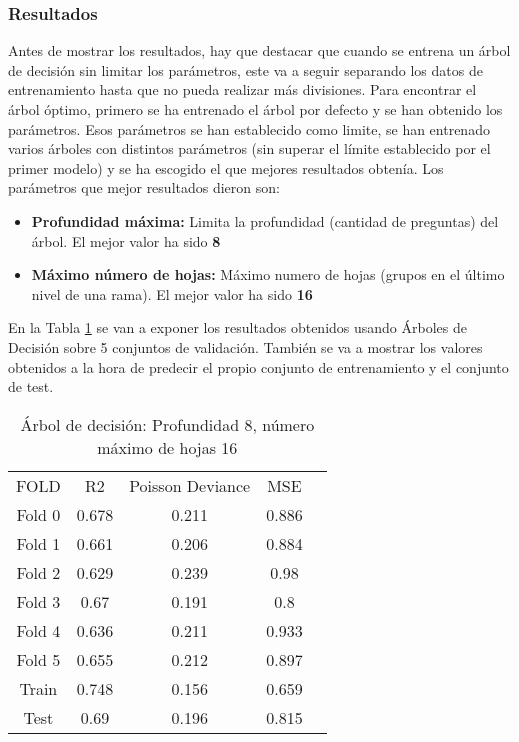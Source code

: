 \subsubsection*{Resultados}
\label{sec:res_tree}
Antes de mostrar los resultados, hay que destacar que cuando se entrena un árbol de decisión sin limitar los parámetros, este va a seguir separando los datos de entrenamiento hasta que no pueda realizar más divisiones. Para encontrar el árbol óptimo, primero se ha entrenado el árbol por defecto y se han obtenido los parámetros. Esos parámetros se han establecido como limite, se han entrenado varios árboles con distintos parámetros (sin superar el límite establecido por el primer modelo) y se ha escogido el que mejores resultados obtenía. Los parámetros que mejor resultados dieron son: \\
\begin{itemize}
	\item \textbf{Profundidad máxima:} Limita la profundidad (cantidad de preguntas) del árbol. El mejor valor ha sido \textbf{8}
	\item \textbf{Máximo número de hojas:} Máximo numero de hojas (grupos en el último nivel de una rama). El mejor valor ha sido \textbf{16}
\end{itemize}
En la Tabla \ref{tab:tree_res} se van a exponer los resultados obtenidos usando Árboles de Decisión sobre 5 conjuntos de validación. También se va a mostrar los valores obtenidos a la hora de predecir el propio conjunto de entrenamiento y el conjunto de test.
\begin{table}[H]
	\centering
	\begin{tabular}{|c|c|c|c|c}
		\cline{1-4}
		FOLD   & R2    & Poisson Deviance & MSE   \\ \cline{1-4}
		Fold 0 & 0.678 & 0.211            & 0.886 \\ \cline{1-4}
		Fold 1 & 0.661 & 0.206            & 0.884 \\ \cline{1-4}
		Fold 2 & 0.629 & 0.239            & 0.98  \\ \cline{1-4}
		Fold 3 & 0.67  & 0.191            & 0.8   \\ \cline{1-4}
		Fold 4 & 0.636 & 0.211            & 0.933 \\ \cline{1-4}
		Fold 5 & 0.655 & 0.212            & 0.897 \\ \cline{1-4}
		Train  & 0.748 & 0.156            & 0.659 \\ \cline{1-4}
		Test   & 0.69  & 0.196            & 0.815 \\ \cline{1-4}
	\end{tabular}
	\caption{Árbol de decisión: Profundidad 8, número máximo de hojas 16}
	\label{tab:tree_res}
\end{table}
